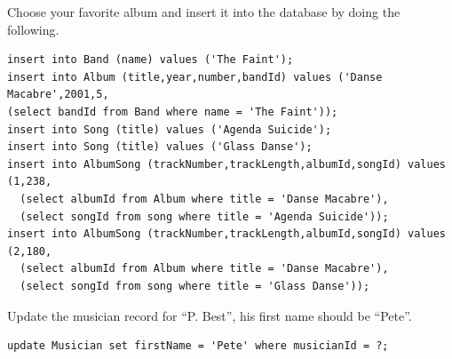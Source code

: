 \documentclass[12pt]{exam}
\begin{document}
\begin{questions}

\question Choose your favorite album and insert it into the database by doing 
  the following.

\begin{solution}

\begin{verbatim}
insert into Band (name) values ('The Faint');
insert into Album (title,year,number,bandId) values ('Danse Macabre',2001,5,
(select bandId from Band where name = 'The Faint'));
insert into Song (title) values ('Agenda Suicide');
insert into Song (title) values ('Glass Danse');
insert into AlbumSong (trackNumber,trackLength,albumId,songId) values (1,238,
  (select albumId from Album where title = 'Danse Macabre'),
  (select songId from song where title = 'Agenda Suicide'));
insert into AlbumSong (trackNumber,trackLength,albumId,songId) values (2,180,
  (select albumId from Album where title = 'Danse Macabre'),
  (select songId from song where title = 'Glass Danse'));
\end{verbatim}
\end{solution}
  
\question Update the musician record for ``P. Best'', his first name should be
``Pete''.  

\begin{solution}

\begin{verbatim}
update Musician set firstName = 'Pete' where musicianId = ?;
\end{verbatim}
\end{solution}


\end{questions}
\end{document}
